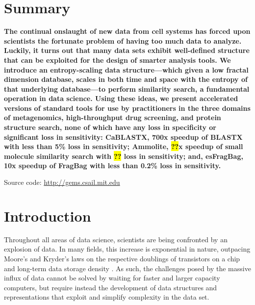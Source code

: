 \documentclass[review,preprint,12pt]{elsarticle}
\renewcommand{\cite}{\citep} %
\theoremstyle{definition}
\theoremstyle{remark}
\numberwithin{equation}{section}
\begin{document}
\section{Summary}
{ \bfseries
    The continual onslaught of new data from cell systems has forced upon scientists the fortunate problem of having too much data to analyze.
    Luckily, it turns out that many data sets exhibit well-defined structure that can be exploited for the design of 
smarter analysis tools.
    We introduce an entropy-scaling data structure---which given a low fractal dimension database, scales in both time and space with the entropy of that underlying database---to perform similarity search, a fundamental operation in data science.
    Using these ideas, we present accelerated versions of standard tools for use by practitioners in the three domains of metagenomics, high-throughput drug screening, and protein structure search, none of which have any loss in specificity or significant loss in sensitivity:
    CaBLASTX, 700x speedup of BLASTX with less than 5\% loss in sensitivity; Ammolite, \hl{??}x speedup of small molecule similarity search with \hl{??} loss in sensitivity; and, esFragBag, 10x speedup of FragBag with less than 0.2\% loss in sensitivity.

    Source code: \url{http://gems.csail.mit.edu}
}

\section{Introduction}
Throughout all areas of data science, scientists are being confronted by an 
explosion of data.
In many fields, this increase is exponential in nature, outpacing Moore's and Kryder's laws on the respective doublings of transistors on a chip and long-term data storage density \cite{kahn2011future}.
As such, the challenges posed by the massive influx of data cannot be solved by waiting for faster and larger capacity computers, but require instead the development of data structures and representations that exploit and simplify complexity in the data set.
\end{document}
